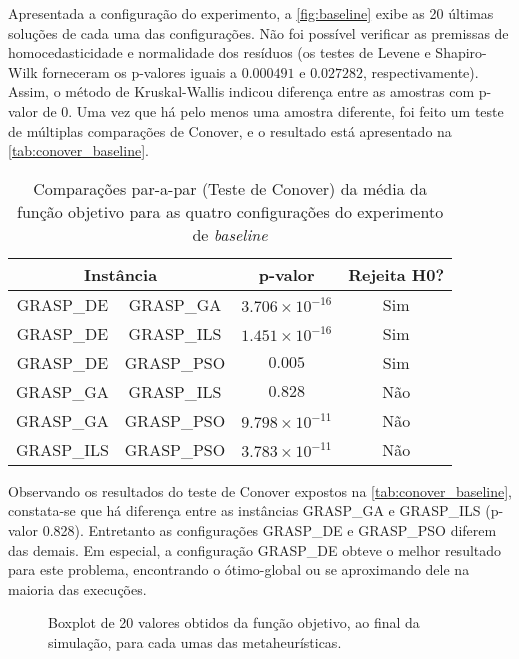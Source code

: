 Apresentada a configuração do experimento, a \autoref{fig:baseline} exibe as 20 últimas soluções de cada uma das configurações. Não foi possível verificar as premissas de homocedasticidade e normalidade dos resíduos (os testes de Levene e Shapiro-Wilk forneceram os p-valores iguais a $0.000491$ e $0.027282$, respectivamente). Assim, o método de Kruskal-Wallis indicou diferença entre as amostras com p-valor de $0$. Uma vez que há pelo menos uma amostra diferente, foi feito um teste de múltiplas comparações de Conover, e o resultado está apresentado na \autoref{tab:conover_baseline}.

\begin{table}
    \caption{Comparações par-a-par (Teste de Conover) da média da função objetivo para as quatro configurações do experimento de \textit{baseline} }
	\centering
    \begin{tabular}{cccc}
        \toprule
        \multicolumn{2}{c}{\textbf{Instância}}        &    \textbf{p-valor}       &   \textbf{Rejeita H0?}\\
        \midrule
        GRASP\_DE   &	GRASP\_GA	&	$3.706 \times 10^{-16}$     &   Sim \\
        GRASP\_DE	&	GRASP\_ILS	&   $1.451 \times 10^{-16}$     &   Sim \\
        GRASP\_DE	&	GRASP\_PSO  &   $0.005$                     &   Sim \\
        GRASP\_GA	&	GRASP\_ILS  &   $0.828$                     &   Não \\
        GRASP\_GA 	& 	GRASP\_PSO  &   $9.798 \times 10^{-11}$     &   Não \\
        GRASP\_ILS	&	GRASP\_PSO  &   $3.783 \times 10^{-11}$     &   Não \\
        \bottomrule
    \end{tabular}
    \label{tab:conover_baseline}
\end{table}

Observando os resultados do teste de Conover expostos na \autoref{tab:conover_baseline}, constata-se que há diferença entre as instâncias GRASP\_GA e GRASP\_ILS (p-valor 0.828). Entretanto as configurações GRASP\_DE e GRASP\_PSO diferem das demais. Em especial, a configuração GRASP\_DE obteve o melhor resultado para este problema, encontrando o ótimo-global ou se aproximando dele na maioria das execuções.

\begin{figure}[ht!]
\centering
\caption{Boxplot de 20 valores obtidos da  função objetivo, ao final da simulação, para cada umas das metaheurísticas.}

\label{fig:baseline}
\end{figure}


